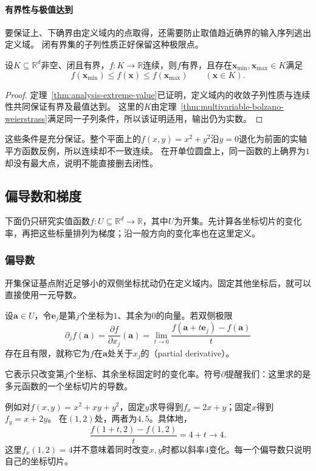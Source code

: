 \paragraph{有界性与极值达到}
要保证上、下确界由定义域内的点取得，还需要防止取值趋近确界的输入序列逃出定义域。
闭有界集的子列性质正好保留这种极限点。
\begin{theorem}[闭有界集上的极值定理]
\label{thm:multivariable-extreme-value}
设$K\subseteq\mathbb R^d$非空、闭且有界，$f:K\to\mathbb R$连续，则$f$有界，且存在$\bm x_{\min},\bm x_{\max}\in K$满足
\[
 f(\bm x_{\min})\leq f(\bm x)\leq f(\bm x_{\max})\qquad(\bm x\in K).
\]
\end{theorem}
\begin{proof}
定理~\ref{thm:analysis-extreme-value}已证明，定义域内的收敛子列性质与连续性共同保证有界及最值达到。
这里的$K$由定理~\ref{thm:multivariable-bolzano-weierstrass}满足同一子列条件，所以该证明适用，输出仍为实数。
\end{proof}
这些条件是充分保证。整个平面上的$f(x,y)=x^2+y^2$沿$y=0$退化为前面的实轴平方函数反例，所以连续却不一致连续。
在开单位圆盘上，同一函数的上确界为$1$却没有最大点，说明不能直接删去闭性。

\subsection{偏导数和梯度}

下面仍只研究实值函数$f:U\subseteq\mathbb R^d\to\mathbb R$，其中$U$为开集。先计算各坐标切片的变化率，再把这些标量排列为梯度；沿一般方向的变化率也在这里定义。

\subsubsection{偏导数}

开集保证基点附近足够小的双侧坐标扰动仍在定义域内。固定其他坐标后，就可以直接使用一元导数。
\begin{definition}[偏导数]
\label{def:multivariable-partial-derivative}
设$\bm a\in U$，令$\bm e_j$是第$j$个坐标为$1$、其余为$0$的向量。若双侧极限
\[
 \partial_jf(\bm a)=\frac{\partial f}{\partial x_j}(\bm a)
 =\lim_{t\to0}\frac{f(\bm a+t\bm e_j)-f(\bm a)}t
\]
存在且有限，就称它为$f$在$\bm a$处关于$x_j$的（partial derivative）。
\end{definition}
它表示只改变第$j$个坐标、其余坐标固定时的变化率。符号$\partial$提醒我们：这里求的是多元函数的一个坐标切片的导数。

例如对$f(x,y)=x^2+xy+y^2$，固定$y$求导得到$f_x=2x+y$；固定$x$得到$f_y=x+2y$。
在$(1,2)$处，两者为$4,5$。具体地，
\[
 \frac{f(1+t,2)-f(1,2)}t=4+t\longrightarrow4.
\]
这里$f_x(1,2)=4$并不意味着同时改变$x,y$时都以斜率$4$变化。每一个偏导数只说明自己的坐标切片。

